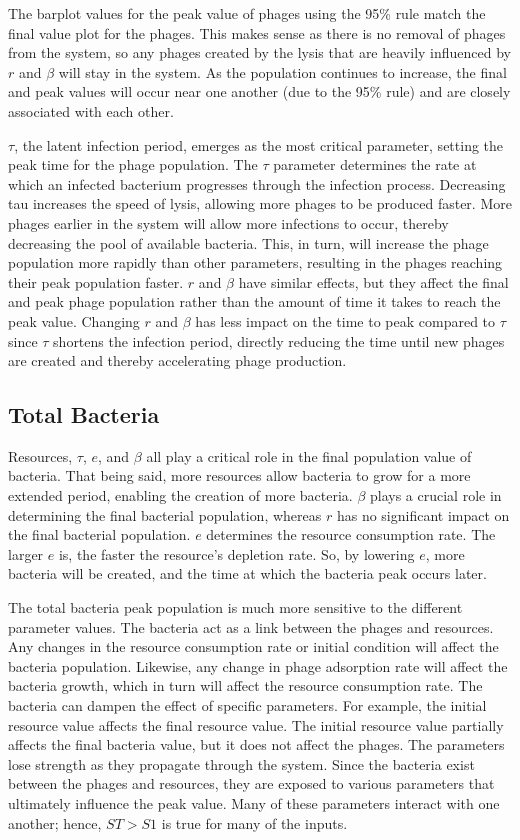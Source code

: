 The barplot values for the peak value of phages using the 95\% rule match the final value plot for the phages. 
This makes sense as there is no removal of phages from the system, so any phages created by the lysis that are heavily influenced by $r$ and $\beta$ will stay in the system. 
As the population continues to increase, the final and peak values will occur near one another (due to the 95\% rule) and are closely associated with each other.

$\tau$, the latent infection period, emerges as the most critical parameter, setting the peak time for the phage population. 
The $\tau$ parameter determines the rate at which an infected bacterium progresses through the infection process. 
Decreasing tau increases the speed of lysis, allowing more phages to be produced faster. 
More phages earlier in the system will allow more infections to occur, thereby decreasing the pool of available bacteria. 
This, in turn, will increase the phage population more rapidly than other parameters, resulting in the phages reaching their peak population faster.
$r$ and $\beta$ have similar effects, but they affect the final and peak phage population rather than the amount of time it takes to reach the peak value. 
Changing $r$ and $\beta$ has less impact on the time to peak compared to $\tau$ since $\tau$ shortens the infection period, directly reducing the time until new phages are created and thereby accelerating phage production.

\subsection{Total Bacteria}
Resources, $\tau$, $e$, and $\beta$ all play a critical role in the final population value of bacteria. 
That being said, more resources allow bacteria to grow for a more extended period, enabling the creation of more bacteria. 
$\beta$ plays a crucial role in determining the final bacterial population, whereas $r$ has no significant impact on the final bacterial population. 
$e$ determines the resource consumption rate. 
The larger $e$ is, the faster the resource’s depletion rate. 
So, by lowering $e$, more bacteria will be created, and the time at which the bacteria peak occurs later. 

The total bacteria peak population is much more sensitive to the different parameter values. 
The bacteria act as a link between the phages and resources. 
Any changes in the resource consumption rate or initial condition will affect the bacteria population. 
Likewise, any change in phage adsorption rate will affect the bacteria growth, which in turn will affect the resource consumption rate. 
The bacteria can dampen the effect of specific parameters. 
For example, the initial resource value affects the final resource value. 
The initial resource value partially affects the final bacteria value, but it does not affect the phages. 
The parameters lose strength as they propagate through the system. 
Since the bacteria exist between the phages and resources, they are exposed to various parameters that ultimately influence the peak value. 
Many of these parameters interact with one another; hence, $ST > S1$ is true for many of the inputs. 


